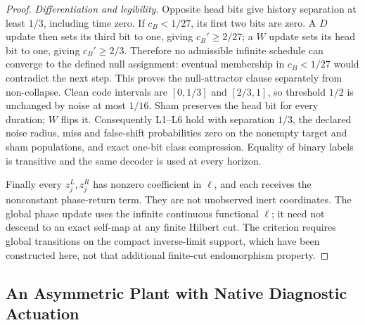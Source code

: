 \documentclass[11pt,a4paper]{article}
\theoremstyle{definition}
\begin{document}
\begin{proof}
\emph{Differentiation and legibility.} Opposite head bits give history separation at least $1/3$, including time zero. If $c_B<1/27$, its first two bits are zero. A $D$ update then sets its third bit to one, giving $c_B'\ge2/27$; a $W$ update sets its head bit to one, giving $c_B'\ge2/3$. Therefore no admissible infinite schedule can converge to the defined null assignment: eventual membership in $c_B<1/27$ would contradict the next step. This proves the null-attractor clause separately from non-collapse. Clean code intervals are $[0,1/3]$ and $[2/3,1]$, so threshold $1/2$ is unchanged by noise at most $1/16$. Sham preserves the head bit for every duration; $W$ flips it. Consequently L1--L6 hold with separation $1/3$, the declared noise radius, miss and false-shift probabilities zero on the nonempty target and sham populations, and exact one-bit class compression. Equality of binary labels is transitive and the same decoder is used at every horizon.

Finally every $z_j^L,z_j^R$ has nonzero coefficient in $\ell$, and each receives the nonconstant phase-return term. They are not unobserved inert coordinates. The global phase update uses the infinite continuous functional $\ell$; it need not descend to an exact self-map at any finite Hilbert cut. The criterion requires global transitions on the compact inverse-limit support, which have been constructed here, not that additional finite-cut endomorphism property.
\end{proof}


\subsection{An Asymmetric Plant with Native Diagnostic Actuation}
\end{document}
